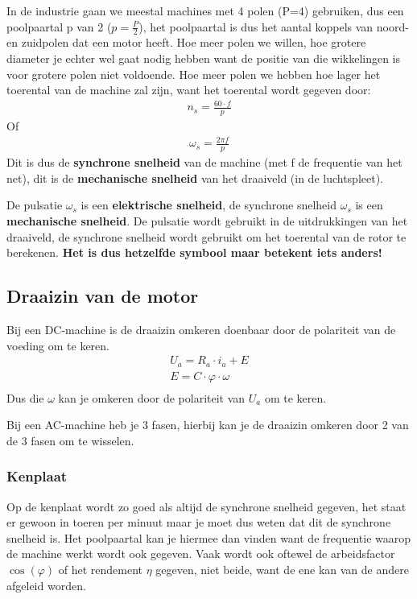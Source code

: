 In de industrie gaan we meestal machines met 4 polen (P=4) gebruiken, dus een poolpaartal
p van 2 ($p = \frac{P}{2}$), het poolpaartal is dus het aantal koppels van noord- en
zuidpolen dat een motor heeft.
Hoe meer polen we willen, hoe grotere diameter je echter wel gaat nodig hebben want de
positie van die wikkelingen is voor grotere polen niet voldoende.
Hoe meer polen we hebben hoe lager het toerental van de machine zal zijn, want het
toerental wordt gegeven door:
\begin{align*}
    n_s = \frac{60 \cdot f}{p}
\end{align*}
Of
\begin{align*}
    \omega_s = \frac{2 \pi f}{p}
\end{align*}
Dit is dus de \textbf{synchrone snelheid} van de machine (met f de frequentie van het
net), dit is de \textbf{mechanische snelheid} van het draaiveld (in de luchtspleet).

\begin{warningbox}
  De pulsatie $\omega_s$ is een \textbf{elektrische snelheid}, de synchrone snelheid
  $\omega_s$ is een \textbf{mechanische snelheid}.
  De pulsatie wordt gebruikt in de uitdrukkingen van het draaiveld, de synchrone snelheid
  wordt gebruikt om het toerental van de rotor te berekenen.\textbf{ Het is dus hetzelfde
  symbool maar betekent iets anders!}
\end{warningbox}

\subsection{Draaizin van de motor}
Bij een DC-machine is de draaizin omkeren doenbaar door de polariteit van de voeding om te
keren.
\begin{align*}
  U_a = R_a \cdot i_a + E \\
  E = C \cdot \varphi \cdot \omega \\
\end{align*}
Dus die $\omega$ kan je omkeren door de polariteit van $U_a$ om te keren.

Bij een AC-machine heb je 3 fasen, hierbij kan je de draaizin omkeren door 2 van de 3
fasen om te wisselen.

\subsubsection{Kenplaat}
Op de kenplaat wordt zo goed als altijd de synchrone snelheid gegeven, het staat er gewoon
in toeren per minuut maar je moet dus weten dat dit de synchrone snelheid is.
Het poolpaartal kan je hiermee dan vinden want de frequentie waarop de machine werkt wordt
ook gegeven.
Vaak wordt ook oftewel de arbeidsfactor $\cos(\varphi)$ of het rendement $\eta$ gegeven,
niet beide, want de ene kan van de andere afgeleid worden.

